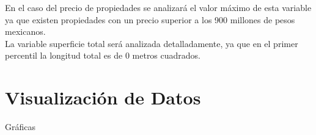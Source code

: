 \documentclass{report}
\begin{document}
En el caso del precio de propiedades se analizará el valor máximo de esta variable ya que existen propiedades con un precio superior a los 900 millones de pesos mexicanos.\\

La variable superficie total será analizada detalladamente, ya que en el primer percentil la longitud total es de 0 metros cuadrados.\\
    
    \section{Visualización de Datos}
    Gráficas
\end{document}
